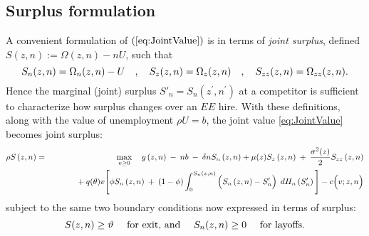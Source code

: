 \subsection{Surplus formulation}
A convenient formulation of $(\ref{eq:JointValue})$ is in terms of \emph{joint surplus}, defined $S(z,n):= \Omega(z,n)-nU$, such that
\vspace*{-.3cm}\begin{equation*}
S_n(z,n) = \Omega_n(z,n) - U
\quad,\quad
S_z(z,n) = \Omega_z(z,n)
\quad,\quad S_{zz}(z,n) = \Omega_{zz}(z,n).
\vspace*{-.3cm}\end{equation*}
Hence the marginal (joint) surplus $S'_n=S_n(z^\prime,n^\prime)$ at a competitor is sufficient to characterize how surplus changes over an $EE$ hire.
With these definitions, along with the value of unemployment $\rho U = b$, the joint value \eqref{eq:JointValue} becomes joint surplus:
\vspace*{-.3cm}\begin{eqnarray}\label{eq:finalBellmanS}
\rho S\left(z,n\right) & = & \max_{v\geq0}\quad y\left(z,n\right)\:-\:nb\:-
\:\delta nS_{n}\left(z,n\right) + \mu(z)S_{z}\left(z,n\right)\:+\:\frac{\sigma^{2}(z)}{2}S_{zz}\left(z,n\right)\\
&& \quad\quad\quad+\:q(\theta)v
\Bigg[
\phi S_{n}\left(z,n\right)\:+\:\left(1-\phi\right)\int_{0}^{S_{n}\left(z,n\right)} \Big( S_{n}\left(z,n\right)-S_{n}^{\prime} \Big) \:\:dH_n\left(S_{n}^{\prime}\right)
\Bigg] - c\Big(v;z,n\Big)  \notag %
\vspace*{-.3cm}\end{eqnarray}
subject to the same two boundary conditions now expressed in terms of surplus:
\vspace*{-.3cm}\begin{equation}\label{eq:BoundariesS}
\text{$S(z,n)\geq \vartheta\quad$ for exit, and $\quad S_n(z,n)\geq 0\quad$ for layoffs.}
\vspace*{-.3cm}\end{equation}

